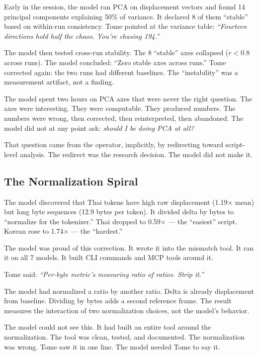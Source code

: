\documentclass[11pt,a4paper]{article}
\newcommand{\cq}[1]{\textcolor{q}{\textit{``#1''}}}
\begin{document}
Early in the session, the model ran PCA on displacement vectors and found 14 principal components explaining 50\% of variance. It declared 8 of them ``stable'' based on within-run consistency. Tome pointed at the variance table: \cq{Fourteen directions hold half the chaos. You're chasing 194.}

The model then tested cross-run stability. The 8 ``stable'' axes collapsed ($r < 0.8$ across runs). The model concluded: ``Zero stable axes across runs.'' Tome corrected again: the two runs had different baselines. The ``instability'' was a measurement artifact, not a finding.

The model spent two hours on PCA axes that were never the right question. The axes were interesting. They were computable. They produced numbers. The numbers were wrong, then corrected, then reinterpreted, then abandoned. The model did not at any point ask: \textit{should I be doing PCA at all?}

That question came from the operator, implicitly, by redirecting toward script-level analysis. The redirect was the research decision. The model did not make it.

\subsection{The Normalization Spiral}

The model discovered that Thai tokens have high raw displacement (1.19$\times$ mean) but long byte sequences (12.9 bytes per token). It divided delta by bytes to ``normalize for the tokenizer.'' Thai dropped to 0.59$\times$ --- the ``easiest'' script. Korean rose to 1.74$\times$ --- the ``hardest.''

The model was proud of this correction. It wrote it into the mismatch tool. It ran it on all 7 models. It built CLI commands and MCP tools around it.

Tome said: \cq{Per-byte metric's measuring ratio of ratios. Strip it.}

The model had normalized a ratio by another ratio. Delta is already displacement from baseline. Dividing by bytes adds a second reference frame. The result measures the interaction of two normalization choices, not the model's behavior.

The model could not see this. It had built an entire tool around the normalization. The tool was clean, tested, and documented. The normalization was wrong. Tome saw it in one line. The model needed Tome to say it.
\end{document}
